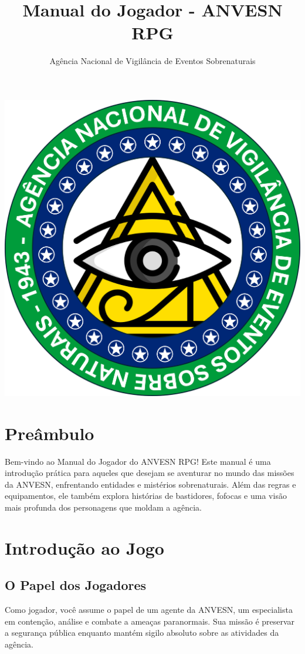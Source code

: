 \documentclass{book}
\title{Manual do Jogador - ANVESN RPG}
\author{Agência Nacional de Vigilância de Eventos Sobrenaturais}
\date{}
\begin{document}
\maketitle
\begin{center}
\newpage
\vspace*{\fill}
\includegraphics[scale=.9]{imagens/ANVESN_LOGO.png}
\vspace*{\fill}
\newpage
\end{center}

\tableofcontents
\pagestyle{fancy}
\chapter*{Preâmbulo}
Bem-vindo ao Manual do Jogador do ANVESN RPG! Este manual é uma introdução prática para aqueles que desejam se aventurar no mundo das missões da ANVESN, enfrentando entidades e mistérios sobrenaturais. Além das regras e equipamentos, ele também explora histórias de bastidores, fofocas e uma visão mais profunda dos personagens que moldam a agência.

\chapter{Introdução ao Jogo}
\section{O Papel dos Jogadores}
Como jogador, você assume o papel de um agente da ANVESN, um especialista em contenção, análise e combate a ameaças paranormais. Sua missão é preservar a segurança pública enquanto mantém sigilo absoluto sobre as atividades da agência.
\end{document}
